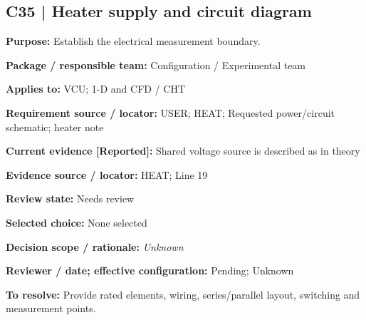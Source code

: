 \documentclass[11pt]{article}
\begin{document}
\par\noindent\begin{minipage}{\textwidth}\small\setlength{\parskip}{2pt}
\subsection*{C35 | Heater supply and circuit diagram}
\textbf{Purpose:} Establish the electrical measurement boundary.\par
\textbf{Package / responsible team:} Configuration / Experimental team\par
\textbf{Applies to:} VCU; 1-D and CFD / CHT\par
\textbf{Requirement source / locator:} USER; HEAT; Requested power/circuit schematic; heater note\par
\textbf{Current evidence [Reported]:} Shared voltage source is described as in theory\par
\textbf{Evidence source / locator:} HEAT; Line 19\par
\textbf{Review state:} Needs review\par
\textbf{Selected choice:} None selected\par
\textbf{Decision scope / rationale:} \textit{Unknown}\par
\textbf{Reviewer / date; effective configuration:} Pending; Unknown\par
\textbf{To resolve:} Provide rated elements, wiring, series/parallel layout, switching and measurement points.\par
\end{minipage}\par\vspace{5pt}
\end{document}
